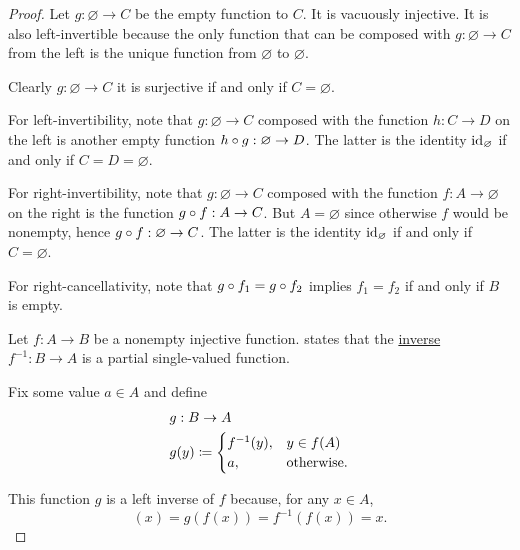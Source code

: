 \begin{proof}
   Let \( g: \varnothing \to C \) be the empty function to \( C \). It is vacuously injective. It is also left-invertible because the only function that can be composed with \( g: \varnothing \to C \) from the left is the unique function from \( \varnothing \) to \( \varnothing \).

  Clearly \( g: \varnothing \to C \) it is surjective if and only if \( C = \varnothing \).

  For left-invertibility, note that \( g: \varnothing \to C \) composed with the function \( h: C \to D \) on the left is another empty function \( h \mathbin \circ g: \varnothing \to D \). The latter is the identity \( \operatorname{id}_\varnothing \) if and only if \( C = D = \varnothing \).

  For right-invertibility, note that \( g: \varnothing \to C \) composed with the function \( f: A \to \varnothing \) on the right is the function \( g \mathbin \circ f: A \to C \). But \( A = \varnothing \) since otherwise \( f \) would be nonempty, hence \( g \mathbin \circ f: \varnothing \to C \). The latter is the identity \( \operatorname{id}_\varnothing \) if and only if \( C = \varnothing \).

  For right-cancellativity, note that \( g \mathbin \circ f_1 = g \mathbin \circ f_2 \) implies \( f_1 = f_2 \) if and only if \( B \) is empty.

   Let \( f: A \to B \) be a nonempty injective function.  states that the \hyperref[def:multi_valued_function/inverse]{inverse} \( f^{-1}: B \to A \) is a partial single-valued function.

  Fix some value \( a \in A \) and define
  \begin{equation*}
    \begin{aligned}
      &g: B \to A \\
      &g(y) \coloneqq \begin{cases}
        f^{-1}(y), &y \in f(A) \\
        a,         &\T{otherwise.}
      \end{cases}
    \end{aligned}
  \end{equation*}

  This function \( g \) is a left inverse of \( f \) because, for any \( x \in A \),
  \begin{equation*}
    [g \bincirc f](x)
    =
    g(f(x))
    =
    f^{-1}(f(x))
    =
    x.
  \end{equation*}


\end{proof}
